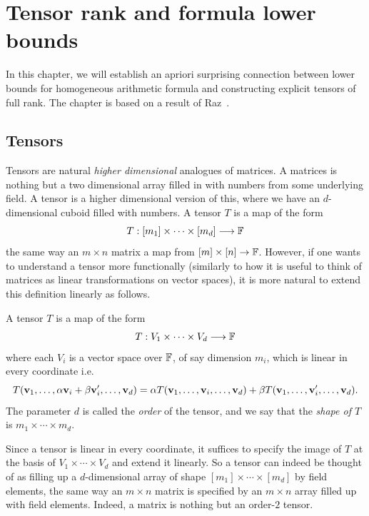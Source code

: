 \chapter{Tensor rank and formula lower bounds}\label{chap:tensorrk}

In this chapter, we will establish an apriori surprising connection between lower bounds for homogeneous arithmetic formula and constructing explicit tensors of full rank.
The chapter is based on a result of Raz~\cite{raz10}.

\section{Tensors}

Tensors are natural \emph{higher dimensional} analogues of matrices.
A matrices is nothing but a two dimensional array filled in with numbers from some underlying field.
A tensor is a higher dimensional version of this, where we have an $d$-dimensional cuboid filled with numbers.
A tensor $T$ is a map of the form
\[
T: [m_1] \times \cdots \times [m_d] \longrightarrow \mathbb{F}
\]
the same way an $m\times n$ matrix a map from $[m] \times [n] \rightarrow \mathbb{F}$.
However, if one wants to understand a tensor more functionally (similarly to how it is useful to think of matrices as linear transformations on vector spaces), it is more natural to extend this definition linearly as follows.

\begin{definition}[Tensor]\label{defn:tensor}
A tensor $T$ is a map of the form 
\[
T: V_1 \times \cdots \times V_d \longrightarrow \mathbb{F}
\]
where each $V_i$ is a vector space over $\mathbb{F}$, of say dimension $m_i$, which is linear in every coordinate i.e.
\[
T(\mathbf{v}_1, \ldots,\alpha\mathbf{v}_i + \beta\mathbf{v}_i', \ldots, \mathbf{v}_d) = \alpha T(\mathbf{v}_1, \ldots,\mathbf{v}_i, \ldots, \mathbf{v}_d) + \beta T(\mathbf{v}_1, \ldots,\mathbf{v}_i', \ldots, \mathbf{v}_d).
\]
The parameter $d$ is called the \emph{order} of the tensor, and we say that the \emph{shape of $T$} is $m_1 \times \cdots \times m_d$. 
\end{definition}
Since a tensor is linear in every coordinate, it suffices to specify the image of $T$ at the basis of $V_1 \times \cdots \times V_d$ and extend it linearly.
So a tensor can indeed be thought of as filling up a $d$-dimensional array of shape $[m_1]\times \cdots \times [m_d]$ by field elements, the same way an $m\times n$ matrix is specified by an $m\times n$ array filled up with field elements.
Indeed, a matrix is nothing but an order-$2$ tensor.

